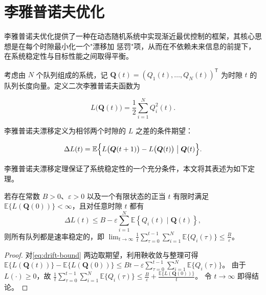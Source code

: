\section{李雅普诺夫优化}

李雅普诺夫优化提供了一种在动态随机系统中实现渐近最优控制的框架，其核心思想是在每个时隙最小化一个"漂移加
惩罚"项，从而在不依赖未来信息的前提下，在系统稳定性与目标性能之间取得平衡。

考虑由 $N$ 个队列组成的系统，记 $\boldsymbol{Q}(t) = (Q_1(t),\ldots,Q_N(t))^{\mathsf{T}}$ 为时隙 $t$
的队列长度向量。定义二次李雅普诺夫函数为

\begin{equation}\label{eq:lyapunov}
  L\bigl(\boldsymbol{Q}(t)\bigr) = \frac{1}{2}\sum_{i=1}^{N}Q_i^2(t).
\end{equation}

李雅普诺夫漂移定义为相邻两个时隙的 $L$ 之差的条件期望：

\begin{equation}\label{eq:drift}
  \Delta L(t) =
  \mathbb{E}\Bigl\{L\bigl(\boldsymbol{Q}(t+1)\bigr) - L\bigl(\boldsymbol{Q}(t)\bigr)\;
  \big|\;\boldsymbol{Q}(t)\Bigr\}.
\end{equation}

李雅普诺夫漂移定理保证了系统稳定性的一个充分条件，本文将其表述为如下定理。

\begin{theorem}\label{thm:lyapunov-drift}
  若存在常数 $B>0$、$\varepsilon>0$ 以及一个有限状态的正当 $t$ 有限时满足
  $\mathbb{E}\{L(\boldsymbol{Q}(0))\}<\infty$，且对任意时隙 $t$ 都有
  \begin{equation}\label{eq:drift-bound}
    \Delta L(t) \le B - \varepsilon\sum_{i=1}^{N}\mathbb{E}\left\{Q_i(t)\mid
    \boldsymbol{Q}(t)\right\},
  \end{equation}
  则所有队列都是速率稳定的，即
  $\lim_{t\to\infty}\frac{1}{t}\sum_{\tau=0}^{t-1}\sum_{i=1}^{N}\mathbb{E}\{Q_i(\tau)\} \le \frac{B}{\varepsilon}$。
\end{theorem}

\begin{proof}
  对\cref{eq:drift-bound} 两边取期望，利用鞅收敛与整理可得
  $\mathbb{E}\{L(\boldsymbol{Q}(t))\}-\mathbb{E}\{L(\boldsymbol{Q}(0))\}
  \le Bt-\varepsilon\sum_{\tau=0}^{t-1}\sum_{i=1}^{N}\mathbb{E}\{Q_i(\tau)\}$。
  由于 $L(\cdot)\ge 0$，故
  $\frac{1}{t}\sum_{\tau=0}^{t-1}\sum_{i=1}^{N}\mathbb{E}\{Q_i(\tau)\}\le
  \frac{B}{\varepsilon}+\frac{\mathbb{E}\{L(\boldsymbol{Q}(0))\}}{t}$。
  令 $t\to\infty$ 即得结论。
\end{proof}

